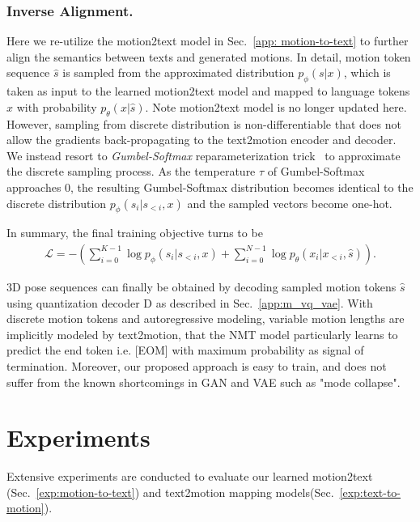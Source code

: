 \documentclass[runningheads]{llncs}
\newcommand{\beforesection}{\vspace{-2mm}}
\newcommand{\aftersection}{\vspace{-2mm}}
\newcommand{\beforesubsection}{\vspace{-2mm}}
\newcommand{\beforesubsubsection}{\vspace{-5mm}}
\begin{document}
\beforesubsubsection
\subsubsection{Inverse Alignment.} Here we re-utilize the motion2text model in Sec.~\ref{app: motion-to-text} to further align the semantics between texts and generated motions. In detail, motion token sequence $\hat{s}$ is sampled from the approximated distribution $p_\phi(s|x)$, which is taken as input to the learned motion2text model and mapped to language tokens $x$ with probability $p_\theta(x|\hat{s})$. Note motion2text model is no longer updated here. However, sampling from discrete distribution is non-differentiable that does not allow the gradients back-propagating to the text2motion encoder and decoder. We instead resort to \textit{Gumbel-Softmax} reparameterization trick~\cite{jang2016categorical} to approximate the discrete sampling process. As the temperature $\tau$ of Gumbel-Softmax approaches 0, the resulting Gumbel-Softmax distribution becomes identical to the discrete distribution $p_\phi(s_i|s_{<i},x)$ and the sampled vectors become one-hot.

In summary, the final training objective turns to be
\begin{align}
    \mathcal{L} = -\left(\sum_{i=0}^{K-1}\log p_\phi(s_i|s_{<i}, x) + \sum_{i=0}^{N-1}\log p_\theta(x_i|x_{<i}, \hat{s})\right).
\end{align}

3D pose sequences can finally be obtained by decoding sampled motion tokens $\hat{s}$ using quantization decoder $\mathrm{D}$ as described in Sec.~\ref{app:m_vq_vae}. With discrete motion tokens and autoregressive modeling, variable motion lengths are implicitly modeled by text2motion, that the NMT model particularly learns to predict the end token i.e. [EOM] with maximum probability as signal of termination. Moreover, our proposed approach is easy to train, and does not suffer from the known shortcomings in GAN and VAE such as "mode collapse".

\beforesection
\section{Experiments}
\aftersection

Extensive experiments are conducted to evaluate our learned motion2text (Sec.~\ref{exp:motion-to-text}) and text2motion mapping models(Sec.~\ref{exp:text-to-motion}).

\beforesubsection
\end{document}
